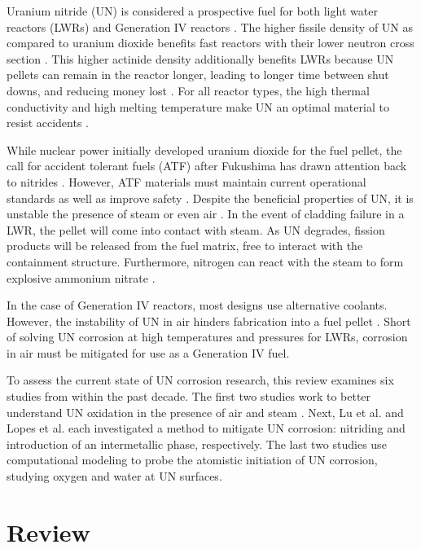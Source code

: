 \documentclass[3p,review,11pt]{elsarticle}
\begin{document}
Uranium nitride (UN) is considered a prospective fuel for both light water reactors (LWRs) and Generation IV reactors \cite{Streit2005,Mizutani1998}. The higher fissile density of UN as compared to uranium dioxide benefits fast reactors with their lower neutron cross section \cite{Silva2009}. This higher actinide density additionally benefits LWRs because UN pellets can remain in the reactor longer, leading to longer time between shut downs, and reducing money lost \cite{Lopes2017}. For all reactor types, the high thermal conductivity and high melting temperature make UN an optimal material to resist accidents \cite{Lopes2017}.
\par 
While nuclear power initially developed uranium dioxide for the fuel pellet, the call for accident tolerant fuels (ATF) after Fukushima has drawn attention back to nitrides \cite{Johnson2016}. However, ATF materials must maintain current operational standards as well as improve safety \cite{Zinkle2014}. Despite the beneficial properties of UN, it is unstable the presence of steam or even air \cite{Johnson2016,Jolkkonen2017,Lopes2017}. In the event of cladding failure in a LWR, the pellet will come into contact with steam. As UN degrades, fission products will be released from the fuel matrix, free to interact with the containment structure. Furthermore, nitrogen can react with the steam to form explosive ammonium nitrate \cite{Jolkkonen2017}.
\par 
 In the case of Generation IV reactors, most designs use alternative coolants. However, the instability of UN in air hinders fabrication into a fuel pellet \cite{Lopes2017}. Short of solving UN corrosion at high temperatures and pressures for LWRs, corrosion in air must be mitigated for use as a Generation IV fuel.
 \par 
 To assess the current state of UN corrosion research, this review examines six studies from within the past decade. The first two studies work to better understand UN oxidation in the presence of air \cite{Johnson2016} and steam \cite{Jolkkonen2017}. Next, Lu et al. \cite{Lu2016} and Lopes et al. \cite{Lopes2017} each investigated a method to mitigate UN corrosion: nitriding and introduction of an intermetallic phase, respectively. The last two studies use computational modeling to probe the atomistic initiation of UN corrosion, studying oxygen \cite{Bocharov2013} and water \cite{Bo2016} at UN surfaces.

\section{Review}
\end{document}
